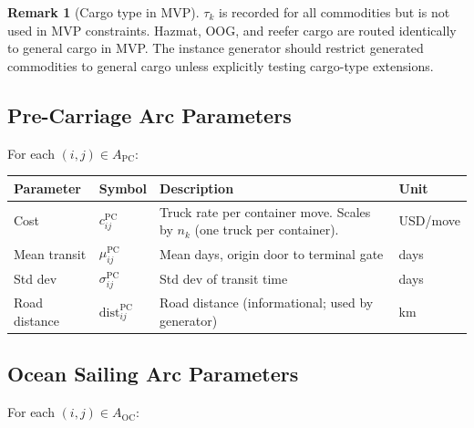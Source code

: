 \documentclass[11pt,a4paper]{article}
\theoremstyle{definition}
\newtheorem{remark}{Remark}
\begin{document}
\begin{remark}[Cargo type in MVP]
$\tau_k$ is recorded for all commodities but is not used in MVP constraints. Hazmat, OOG, and
reefer cargo are routed identically to general cargo in MVP. The instance generator should
restrict generated commodities to general cargo unless explicitly testing cargo-type extensions.
\end{remark}

\subsection{Pre-Carriage Arc Parameters}

For each $(i,j) \in A_{\text{PC}}$:

\begin{center}
\begin{tabular}{llp{6cm}l}
\toprule
Parameter & Symbol & Description & Unit \\
\midrule
Cost & $c_{ij}^{\text{PC}}$ & Truck rate per container move. Scales by $n_k$ (one truck per container). & USD/move \\
Mean transit & $\mu_{ij}^{\text{PC}}$ & Mean days, origin door to terminal gate & days \\
Std dev & $\sigma_{ij}^{\text{PC}}$ & Std dev of transit time & days \\
Road distance & $\text{dist}_{ij}^{\text{PC}}$ & Road distance (informational; used by generator) & km \\
\bottomrule
\end{tabular}
\end{center}

\subsection{Ocean Sailing Arc Parameters}
\label{sec:ocean-params}

For each $(i,j) \in A_{\text{OC}}$:
\end{document}
